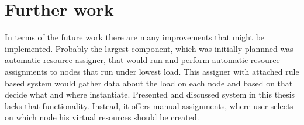\documentclass[11pt]{book}
\begin{document}
    \section{Further work}

	
	In terms of the future work there are many improvements that might be implemented. Probably the largest component, which was initially plannned
        was automatic resource assigner, that would run and perform automatic resource assignments to nodes that run under lowest load. This assigner 
        with attached rule based system would gather data about the load on each node and based on that decide what and where instantiate. Presented 
        and discussed system in this thesis lacks that functionality. Instead, it offers manual assignments, where user selects on which node his 
        virtual resources should be created.


  
  
\end{document}
